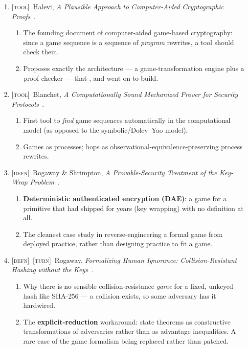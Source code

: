 \documentclass[11pt]{article}
\newcommand{\kind}[1]{{\footnotesize\textsc{\textcolor{yearcolor}{[#1]}}}\ }
\newcommand{\defn}{\kind{defn}}
\newcommand{\tool}{\kind{tool}}
\newcommand{\turn}{\kind{turn}}
\newcommand{\paper}[3]{#1, \emph{#2}~\cite{#3}.}
\begin{document}
\begin{enumerate}
  \item \tool \paper{Halevi}{A Plausible Approach to Computer-Aided
    Cryptographic Proofs}{Hal05}
    \begin{enumerate}
      \item The founding document of computer-aided game-based cryptography:
        since a game sequence is a sequence of \emph{program} rewrites, a tool
        should check them.
      \item Proposes exactly the architecture --- a game-transformation engine
        plus a proof checker --- that \cite{CryptoVerif06},
        \cite{CertiCrypt09} and \cite{EasyCrypt11} went on to build.
    \end{enumerate}

  \item \tool \paper{Blanchet}{A Computationally Sound Mechanized Prover for
    Security Protocols}{CryptoVerif06}
    \begin{enumerate}
      \item First tool to \emph{find} game sequences automatically in the
        computational model (as opposed to the symbolic/Dolev--Yao model).
      \item Games as processes; hops as observational-equivalence-preserving
        process rewrites.
    \end{enumerate}

  \item \defn \paper{Rogaway \& Shrimpton}{A Provable-Security Treatment of the
    Key-Wrap Problem}{RS06}
    \begin{enumerate}
      \item \textbf{Deterministic authenticated encryption (DAE)}: a game for a
        primitive that had shipped for years (key wrapping) with no definition
        at all.
      \item The cleanest case study in reverse-engineering a formal game from
        deployed practice, rather than designing practice to fit a game.
    \end{enumerate}

  \item \defn\turn \paper{Rogaway}{Formalizing Human Ignorance:
    Collision-Resistant Hashing without the Keys}{Rog06}
    \begin{enumerate}
      \item Why there is no sensible collision-resistance \emph{game} for a
        fixed, unkeyed hash like SHA-256 --- a collision exists, so some
        adversary has it hardwired.
      \item The \textbf{explicit-reduction} workaround: state theorems as
        constructive transformations of adversaries rather than as advantage
        inequalities. A rare case of the game formalism being replaced rather
        than patched.
    \end{enumerate}


\end{enumerate}
\end{document}
